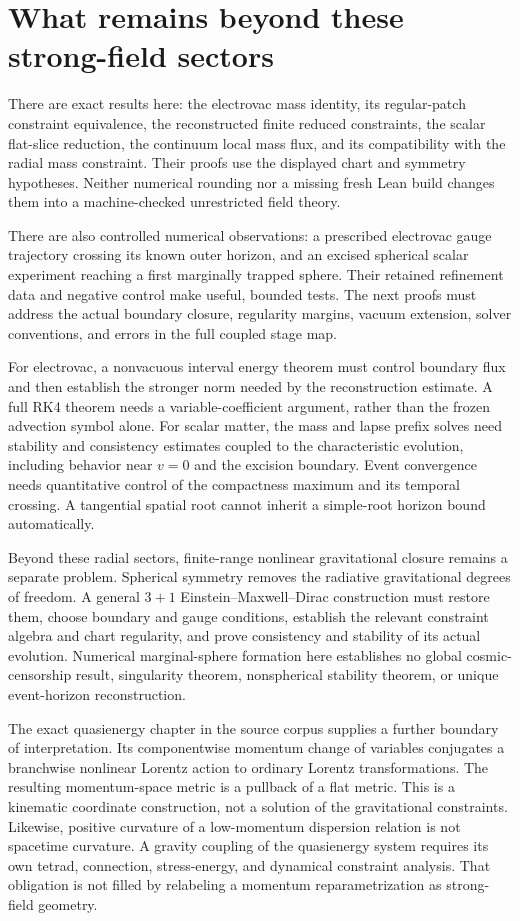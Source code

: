 \section{What remains beyond these strong-field sectors}
\label{c:strong:remaining}

There are exact results here: the electrovac mass identity, its regular-patch constraint equivalence, the reconstructed finite reduced constraints, the scalar flat-slice reduction, the continuum local mass flux, and its compatibility with the radial mass constraint. Their proofs use the displayed chart and symmetry hypotheses. Neither numerical rounding nor a missing fresh Lean build changes them into a machine-checked unrestricted field theory.

There are also controlled numerical observations: a prescribed electrovac gauge trajectory crossing its known outer horizon, and an excised spherical scalar experiment reaching a first marginally trapped sphere. Their retained refinement data and negative control make useful, bounded tests. The next proofs must address the actual boundary closure, regularity margins, vacuum extension, solver conventions, and errors in the full coupled stage map.

For electrovac, a nonvacuous interval energy theorem must control boundary flux and then establish the stronger norm needed by the reconstruction estimate. A full RK4 theorem needs a variable-coefficient argument, rather than the frozen advection symbol alone. For scalar matter, the mass and lapse prefix solves need stability and consistency estimates coupled to the characteristic evolution, including behavior near $v=0$ and the excision boundary. Event convergence needs quantitative control of the compactness maximum and its temporal crossing. A tangential spatial root cannot inherit a simple-root horizon bound automatically.

Beyond these radial sectors, finite-range nonlinear gravitational closure remains a separate problem. Spherical symmetry removes the radiative gravitational degrees of freedom. A general $3+1$ Einstein--Maxwell--Dirac construction must restore them, choose boundary and gauge conditions, establish the relevant constraint algebra and chart regularity, and prove consistency and stability of its actual evolution. Numerical marginal-sphere formation here establishes no global cosmic-censorship result, singularity theorem, nonspherical stability theorem, or unique event-horizon reconstruction.

The exact quasienergy chapter in the source corpus supplies a further boundary of interpretation. Its componentwise momentum change of variables conjugates a branchwise nonlinear Lorentz action to ordinary Lorentz transformations. The resulting momentum-space metric is a pullback of a flat metric. This is a kinematic coordinate construction, not a solution of the gravitational constraints. Likewise, positive curvature of a low-momentum dispersion relation is not spacetime curvature. A gravity coupling of the quasienergy system requires its own tetrad, connection, stress-energy, and dynamical constraint analysis. That obligation is not filled by relabeling a momentum reparametrization as strong-field geometry.

